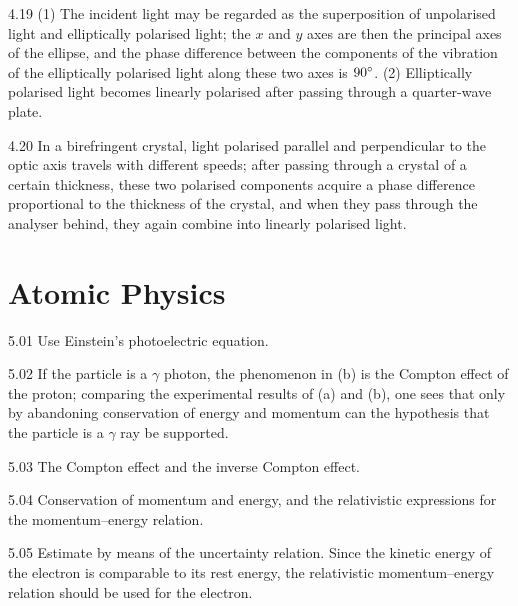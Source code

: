 \begin{hint}{4.19}
(1) The incident light may be regarded as the superposition of unpolarised light and elliptically polarised light; the $x$ and $y$ axes are then the principal axes of the ellipse, and the phase difference between the components of the vibration of the elliptically polarised light along these two axes is $90^{\circ}$. (2) Elliptically polarised light becomes linearly polarised after passing through a quarter-wave plate.
\end{hint}

\begin{hint}{4.20}
In a birefringent crystal, light polarised parallel and perpendicular to the optic axis travels with different speeds; after passing through a crystal of a certain thickness, these two polarised components acquire a phase difference proportional to the thickness of the crystal, and when they pass through the analyser behind, they again combine into linearly polarised light.
\end{hint}

\section{Atomic Physics}

\begin{hint}{5.01}
Use Einstein's photoelectric equation.
\end{hint}

\begin{hint}{5.02}
If the particle is a $\gamma$ photon, the phenomenon in (b) is the Compton effect of the proton; comparing the experimental results of (a) and (b), one sees that only by abandoning conservation of energy and momentum can the hypothesis that the particle is a $\gamma$ ray be supported.
\end{hint}

\begin{hint}{5.03}
The Compton effect and the inverse Compton effect.
\end{hint}

\begin{hint}{5.04}
Conservation of momentum and energy, and the relativistic expressions for the momentum--energy relation.
\end{hint}

\begin{hint}{5.05}
Estimate by means of the uncertainty relation. Since the kinetic energy of the electron is comparable to its rest energy, the relativistic momentum--energy relation should be used for the electron.
\end{hint}

